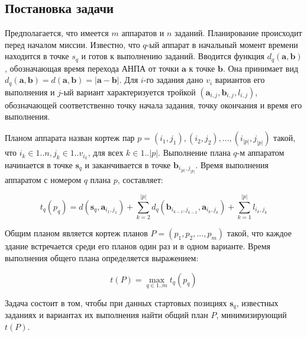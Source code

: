 \documentclass[a4paper,14pt,russian]{article}
\begin{document}
\subsection{Постановка задачи}
Предполагается, что имеется $m$ аппаратов и $n$ заданий. Планирование происходит перед началом миссии. Известно, что $q$-ый аппарат в начальный момент времени находится в точке $s_q$ и готов к выполнению заданий. Вводится функция $d_q(\mathbf{a}, \mathbf{b})$, обозначающая время перехода АНПА от точки $\mathbf{a}$ к точке $\mathbf{b}$. Она принимает вид $d_q(\mathbf{a}, \mathbf{b}) = d(\mathbf{a}, \mathbf{b}) = |\mathbf{a} - \mathbf{b}|$. Для $i$-го задания дано $v_i$ вариантов его выполнения и $j$-ый вариант характеризуется тройкой $(\mathbf{a}_{i, j}, \mathbf{b}_{i,j}, l_{i,j})$, обозначающей соответственно точку начала задания, точку окончания и время его выполнения.


Планом аппарата назван кортеж пар $p = (i_1, j_1), (i_2, j_2), ..., (i_{|p|}, j_{|p|})$ такой, что $i_k \in 1..n, j_k \in 1..v_{i_k}$, для всех $k \in 1..|p|$. Выполнение плана $q$-м аппаратом начинается в точке $\mathbf{s}_q$ и заканчивается в точке $\mathbf{b}_{i_{|p|}, j_{|p|}}$. Время выполнения аппаратом с номером $q$ плана $p$, составляет:

\begin{equation}
t_q(p_q) = d(\mathbf{s}_q, \mathbf{a}_{i_1, j_1}) + \sum_{k=2}^{|p|} d_q(\mathbf{b}_{i_{k-1}, j_{k - 1}}, \mathbf{a}_{i_k, j_k}) + \sum_{k=1}^{|p|}l_{i_k, j_k}
\end{equation}

Общим планом является кортеж планов $P = (p_1, p_2, ..., p_m)$ такой, что каждое здание встречается среди его планов один раз и в одном варианте. Время выполнения общего плана определяется выражением:

\begin{equation}
t(P) = \displaystyle \max_{q \in 1..m} t_q(p_q)
\end{equation}

Задача состоит в том, чтобы при данных стартовых позициях $\mathbf{s}_q$, известных заданиях и вариантах их выполнения найти общий план $P$, минимизирующий $t(P)$.


\end{document}
